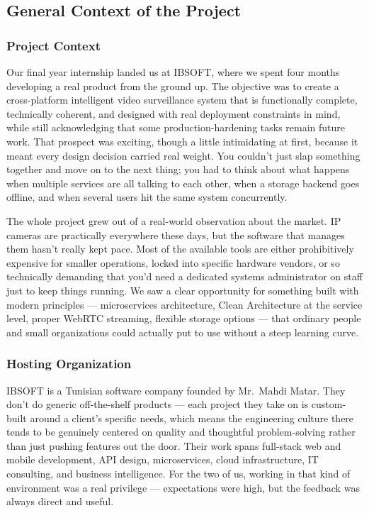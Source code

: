 \documentclass[12pt,a4paper,oneside]{report}
\begin{document}
\subsection{General Context of the Project}
\label{subsec:project_context}

\subsubsection{Project Context}
\hspace{0.8cm}Our final year internship landed us at IBSOFT, where we spent four months developing a real product from the ground up. The objective was to create a cross-platform intelligent video surveillance system that is functionally complete, technically coherent, and designed with real deployment constraints in mind, while still acknowledging that some production-hardening tasks remain future work. That prospect was exciting, though a little intimidating at first, because it meant every design decision carried real weight. You couldn't just slap something together and move on to the next thing; you had to think about what happens when multiple services are all talking to each other, when a storage backend goes offline, and when several users hit the same system concurrently.

\hspace{0.8cm}The whole project grew out of a real-world observation about the market. IP cameras are practically everywhere these days, but the software that manages them hasn't really kept pace. Most of the available tools are either prohibitively expensive for smaller operations, locked into specific hardware vendors, or so technically demanding that you'd need a dedicated systems administrator on staff just to keep things running. We saw a clear opportunity for something built with modern principles — microservices architecture, Clean Architecture at the service level, proper WebRTC streaming, flexible storage options — that ordinary people and small organizations could actually put to use without a steep learning curve.

\subsubsection{Hosting Organization}
\hspace{0.8cm}IBSOFT is a Tunisian software company founded by Mr.\ Mahdi Matar. They don't do generic off-the-shelf products — each project they take on is custom-built around a client's specific needs, which means the engineering culture there tends to be genuinely centered on quality and thoughtful problem-solving rather than just pushing features out the door. Their work spans full-stack web and mobile development, API design, microservices, cloud infrastructure, IT consulting, and business intelligence. For the two of us, working in that kind of environment was a real privilege — expectations were high, but the feedback was always direct and useful.
\end{document}

